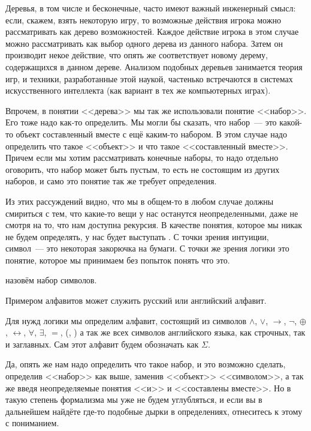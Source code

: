Деревья, в том числе и бесконечные, часто имеют важный инженерный смысл: если, скажем, взять некоторую игру, то возможные действия игрока можно рассматривать как дерево возможностей. Каждое действие игрока в этом случае можно рассматривать как выбор одного дерева из данного набора. Затем он производит некое действие, что опять же соответствует новому дерему, содержащихся в данном дереве. Анализом подобных деревьев занимается теория игр, и техники, разработанные этой наукой, частенько встречаются в системах искусственного интеллекта (как вариант в тех же компьютерных играх).

Впрочем, в понятии <<дерева>> мы так же использовали понятие <<набор>>. Его тоже надо как-то определить. Мы могли бы сказать, что набор~--- это какой-то объект составленный вместе с ещё каким-то набором. В этом случае надо определить что такое <<объект>> и что такое <<составленный вместе>>. Причем если мы хотим рассматривать конечные наборы, то надо отдельно оговорить, что набор может быть пустым, то есть не состоящим из других наборов, и само это понятие так же требует определения.

Из этих рассуждений видно, что мы в общем-то в любом случае должны смириться с тем, что какие-то вещи у нас останутся неопределенными, даже не смотря на то, что нам доступна рекурсия. В качестве понятия, которое мы никак не будем определять, у нас будет выступать . С точки зрения интуиции, символ~--- это некоторая закорючка на бумаги. С точки же зрения логики это понятие, которое мы принимаем без попыток понять что это.

\begin{definition}
 назовём набор символов.
\end{definition}

\begin{example}
Примером алфавитов может служить русский или английский алфавит.
\end{example}

\begin{example}
Для нужд логики мы определим алфавит, состоящий из символов $\land$, $\lor$, $\to$, $\neg$, $\oplus$, $\leftrightarrow$, $\forall$, $\exists$, $=$, (, ) а так же всех символов английского языка, как строчных, так и заглавных. Сам этот алфавит будем обозначать как $\Sigma$.
\end{example}

Да, опять же нам надо определить что такое набор, и это возможно сделать, определив <<набор>> как выше, заменив <<объект>> <<символом>>, а так же введя неопределяемые понятия <<и>> и <<составлены вместе>>. Но в такую степень формализма мы уже не будем углубляться, и если вы в дальнейшем найдёте где-то подобные дырки в определениях, отнеситесь к этому с пониманием.

